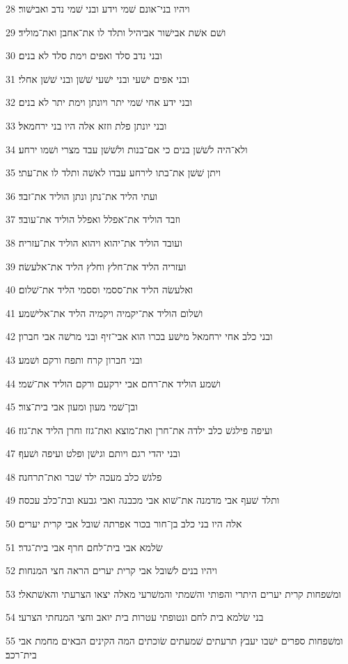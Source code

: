 \par 28 ויהיו בני־אונם שׁמי וידע ובני שׁמי נדב ואבישׁור׃
\par 29 ושׁם אשׁת אבישׁור אביהיל ותלד לו את־אחבן ואת־מוליד׃
\par 30 ובני נדב סלד ואפים וימת סלד לא בנים׃
\par 31 ובני אפים ישׁעי ובני ישׁעי שׁשׁן ובני שׁשׁן אחלי׃
\par 32 ובני ידע אחי שׁמי יתר ויונתן וימת יתר לא בנים׃
\par 33 ובני יונתן פלת וזזא אלה היו בני ירחמאל׃
\par 34 ולא־היה לשׁשׁן בנים כי אם־בנות ולשׁשׁן עבד מצרי ושׁמו ירחע׃
\par 35 ויתן שׁשׁן את־בתו לירחע עבדו לאשׁה ותלד לו את־עתי׃
\par 36 ועתי הליד את־נתן ונתן הוליד את־זבד׃
\par 37 וזבד הוליד את־אפלל ואפלל הוליד את־עובד׃
\par 38 ועובד הוליד את־יהוא ויהוא הוליד את־עזריה׃
\par 39 ועזריה הליד את־חלץ וחלץ הליד את־אלעשׂה׃
\par 40 ואלעשׂה הליד את־ססמי וססמי הליד את־שׁלום׃
\par 41 ושׁלום הוליד את־יקמיה ויקמיה הליד את־אלישׁמע׃
\par 42 ובני כלב אחי ירחמאל מישׁע בכרו הוא אבי־זיף ובני מרשׁה אבי חברון׃
\par 43 ובני חברון קרח ותפח ורקם ושׁמע׃
\par 44 ושׁמע הוליד את־רחם אבי ירקעם ורקם הוליד את־שׁמי׃
\par 45 ובן־שׁמי מעון ומעון אבי בית־צור׃
\par 46 ועיפה פילגשׁ כלב ילדה את־חרן ואת־מוצא ואת־גזז וחרן הליד את־גזז׃
\par 47 ובני יהדי רגם ויותם וגישׁן ופלט ועיפה ושׁעף׃
\par 48 פלגשׁ כלב מעכה ילד שׁבר ואת־תרחנה׃
\par 49 ותלד שׁעף אבי מדמנה את־שׁוא אבי מכבנה ואבי גבעא ובת־כלב עכסה׃
\par 50 אלה היו בני כלב בן־חור בכור אפרתה שׁובל אבי קרית יערים׃
\par 51 שׂלמא אבי בית־לחם חרף אבי בית־גדר׃
\par 52 ויהיו בנים לשׁובל אבי קרית יערים הראה חצי המנחות׃
\par 53 ומשׁפחות קרית יערים היתרי והפותי והשׁמתי והמשׁרעי מאלה יצאו הצרעתי והאשׁתאלי׃
\par 54 בני שׂלמא בית לחם ונטופתי עטרות בית יואב וחצי המנחתי הצרעי׃
\par 55 ומשׁפחות ספרים ישׁבו יעבץ תרעתים שׁמעתים שׂוכתים המה הקינים הבאים מחמת אבי בית־רכב׃

